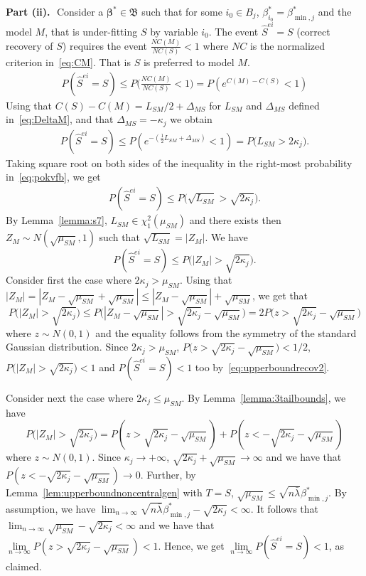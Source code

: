 \documentclass[
  12pt]{article}
\newcommand{\bbeta}{\boldsymbol{\beta}}
\newcommand{\bB}{\mathfrak{B}}
\begin{document}
\textbf{Part (ii).}\,\,
Consider a $\bbeta^*\in \bB$ such that for some $i_{0}\in B_j$, $\beta^*_{i_{0}}=\beta_{\min,j}^*$ and the model $M$, that is under-fitting $S$ by variable $i_{0}$. The event $\hat{S}^{ei}=S$ (correct recovery of $S$) requires the event $\frac{NC(M)}{NC(S)}<1$ where $NC$ is the normalized criterion in~\eqref{eq:CM}. That is $S$ is preferred to model $M$. 
\begin{align*}
P(\hat{S}^{ei}=S) 
\leq P\Big(\frac{NC(M)}{NC(S)}<1\Big)
= P \left( e^{C(M)-C(S)} <1 \right)
\end{align*}
Using that $C(S)-C(M)=L_{SM}/2 + \Delta_{MS}$ for $L_{SM}$ and $\Delta_{MS}$ defined in~\eqref{eq:DeltaM}, and that $\Delta_{MS}=-\kappa_j$ we obtain
\begin{align}\label{eq:pokvfb}
P(\hat{S}^{ei}=S) 
\leq  P \left(e^{-(\frac{1}{2} L_{SM} + \Delta_{MS})} < 1 \right) =
P\Big(L_{SM}>2\kappa_j\Big).
\end{align}
Taking square root on both sides of the inequality in the right-most probability in~\eqref{eq:pokvfb}, we get
\begin{align}\label{eq:pokvfc}
P(\hat{S}^{ei}=S) 
\leq P\Big(\sqrt{L_{SM}}>\sqrt{2\kappa_j}\Big).
\end{align}
By Lemma~\ref{lemma:s7}, $L_{SM}\in \chi^2_1(\mu_{SM})$ and  there exists then $Z_M\sim N(\sqrt{\mu_{SM}},1)$ such that $\sqrt{L_{SM}}=|Z_M|$. We have
\begin{equation}\label{eq:upperboundrecov2}
    P(\hat{S}^{ei}=S) \leq  P\big(|Z_M|>\sqrt{2\kappa_j}\big).
\end{equation}
Consider first the case where $2\kappa_j>\mu_{SM}$. Using that $|Z_M|=|Z_M-\sqrt{\mu_{SM}}+\sqrt{\mu_{SM}}|\leq  |Z_M-\sqrt{\mu_{SM}}| + \sqrt{\mu_{SM}}$, we get that 
$$P\big(|Z_M|>\sqrt{2\kappa_j}\big)\leq P\big(|Z_M-\sqrt{\mu_{SM}}|>\sqrt{2\kappa_j}-\sqrt{\mu_{SM}}\big) = 2P\big(z>\sqrt{2\kappa_j}-\sqrt{\mu_{SM}}\big)$$
where $z\sim N(0,1)$ and the equality follows from the symmetry of the standard Gaussian distribution. Since $2\kappa_j>\mu_{SM}$, $P\big(z>\sqrt{2\kappa_j}-\sqrt{\mu_{SM}}\big)<1/2$, $P\big(|Z_M|>\sqrt{2\kappa_j}\big)<1$ and $P(\hat{S}^{ei}=S)<1$ too by~\eqref{eq:upperboundrecov2}.

Consider next the case where $2\kappa_j\leq\mu_{SM}$. By Lemma~\ref{lemma:3tailbounds}, we have
$$P\big(|Z_M|>\sqrt{2\kappa_j}\big)
    = P\left(z>\sqrt{2\kappa_j}-\sqrt{\mu_{SM}}\right) + P\left(z<-\sqrt{2\kappa_j}-\sqrt{\mu_{SM}}\right)$$ where $z\sim N(0,1)$. Since $\kappa_j\to+\infty$, $\sqrt{2\kappa_j}+\sqrt{\mu_{SM}}\to\infty$ and we have that $P(z<-\sqrt{2\kappa_j}-\sqrt{\mu_{SM}}) \to 0$.  
    Further, by Lemma~\ref{lem:upperboundnoncentralgen} with $T=S$, $\sqrt{\mu_{SM}}\leq \sqrt{n\bar{\lambda}}\beta_{\min,j}^*$. By assumption, we have $\lim_{n\to \infty}\sqrt{n\bar{\lambda}}\beta_{\min,j}^*-\sqrt{2\kappa_j} < \infty$. It follows that $\lim_{n\to \infty}\sqrt{\mu_{SM}}-\sqrt{2\kappa_j} < \infty$ and we have that $\underset{n \to \infty}{\lim}P\left(z>\sqrt{2\kappa_j}-\sqrt{\mu_{SM}}\right)<1$. Hence, we get $\underset{n \to \infty}{\lim}P\left(\hat{S}^{ei} = S \right)<1$, as claimed.
\end{document}
